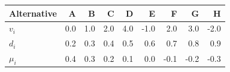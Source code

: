 \begin{tabular}{lrrrrrrrr}
\toprule
Alternative & A & B & C & D & E & F & G & H \\
\midrule
$v_i$ & 0.0 & 1.0 & 2.0 & 4.0 & -1.0 & 2.0 & 3.0 & -2.0 \\
$d_i$ & 0.2 & 0.3 & 0.4 & 0.5 & 0.6 & 0.7 & 0.8 & 0.9 \\
$\mu_i$ & 0.4 & 0.3 & 0.2 & 0.1 & 0.0 & -0.1 & -0.2 & -0.3 \\
\bottomrule
\end{tabular}
